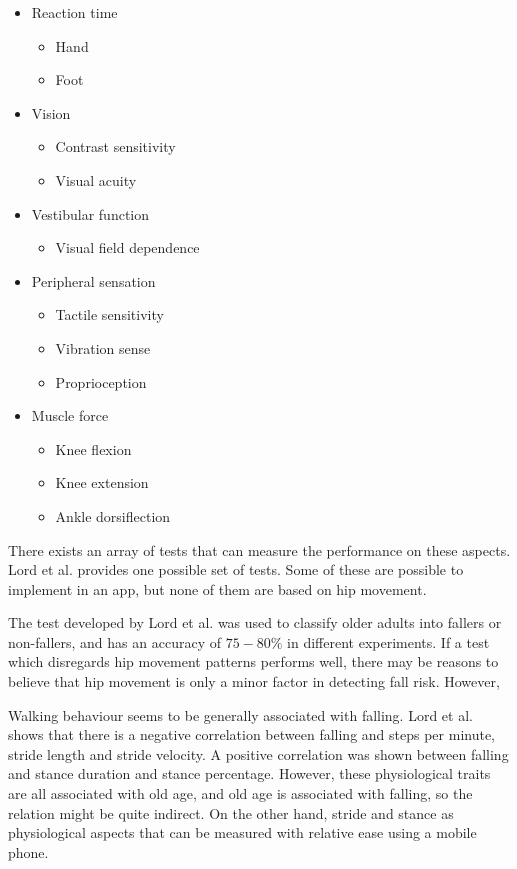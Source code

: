 \begin{itemize}
\item Reaction time
\begin{itemize}
\item Hand
\item Foot
\end{itemize}
\item Vision
\begin{itemize}
\item Contrast sensitivity
\item Visual acuity
\end{itemize}
\item Vestibular function
\begin{itemize}
\item Visual field dependence
\end{itemize}
\item 
Peripheral sensation
\begin{itemize}
\item Tactile sensitivity
\item Vibration sense
\item Proprioception
\end{itemize}
\item Muscle force
\begin{itemize}
\item Knee flexion
\item Knee extension
\item Ankle dorsiflection
\end{itemize}
\end{itemize}


There exists an array of tests that can measure the performance on these aspects. Lord et al. \cite{LMTassessPrev} provides one possible set of tests. Some of these are possible to implement in an app, but none of them are based on hip movement.

The test developed by Lord et al. \cite{LMTassessPrev} was used to classify older adults into fallers or non-fallers, and has an accuracy of $75-80\%$ in different experiments. If a test which disregards hip movement patterns performs well, there may be reasons to believe that hip movement is only a minor factor in detecting fall risk. However, 

Walking behaviour seems to be generally associated with falling. Lord et al. \cite{LLKgaitPatterns} shows that there is a negative correlation between falling and steps per minute, stride length and stride velocity. A positive correlation was shown between falling and stance duration and stance percentage. However, these physiological traits are all associated with old age, and old age is associated with falling, so the relation might be quite indirect. On the other hand, stride and stance as physiological aspects that can be measured with relative ease using a mobile phone.